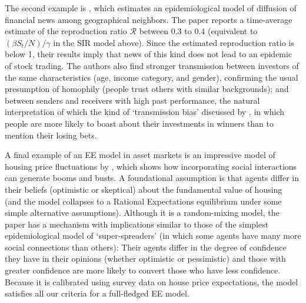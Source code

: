 The second example is , which estimates an epidemiological model of diffusion of financial news among geographical neighbors. The paper reports a time-average estimate of the reproduction ratio $\mathcal{R}$ between $0.3$ to $0.4$ (equivalent to $(\beta S_t/N)/\gamma$ in the SIR model above).  Since the estimated reproduction ratio is below  1, their results imply that news of this kind does not lead to an epidemic of stock trading.    The authors also find stronger transmission between investors of the same characteristics (age, income category, and gender), confirming the usual presumption of homophily (people trust others with similar backgrounds); and between senders and receivers with high past performance, the natural interpretation of which the kind of `transmission bias' discussed by \cite{han2022social}, in which people are more likely to boast about their investments in winners than to mention their losing bets.

A final example of an EE model in asset markets is an impressive model of housing price fluctuations by , which shows how incorporating social interactions can generate booms and busts. A foundational assumption is that agents differ in their beliefs (optimistic or skeptical) about the fundamental value of housing (and the model collapses to a Rational Expectations equilibrium under some simple alternative assumptions).  Although it is a random-mixing model, the paper has a mechanism with implications similar to those of the simplest epidemiological model of `super-spreaders' (in which some agents have many more social connections than others):  Their agents differ in the degree of confidence they have in their opinions (whether optimistic or pessimistic) and those with greater confidence are more likely to convert those who have less confidence.  Because it is calibrated using survey data on house price expectations, the model satisfies all our criteria for a full-fledged EE model.

